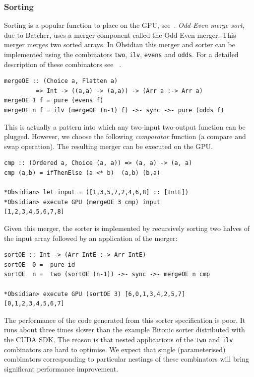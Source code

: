 \subsubsection{Sorting}

Sorting is a popular function to place on the GPU, see~.
{\em Odd-Even merge sort}, due to Batcher, uses a merger component called the Odd-Even merger. This 
merger merges two sorted arrays. In Obsidian this merger and sorter 
can be implemented using the combinators {\tt two}, {\tt ilv}, {\tt evens}
and {\tt odds}. For a detailed description of these combinators see
~.

\begin{small}
\begin{verbatim}
mergeOE :: (Choice a, Flatten a) 
         => Int -> ((a,a) -> (a,a)) -> (Arr a :-> Arr a)
mergeOE 1 f = pure (evens f)
mergeOE n f = ilv (mergeOE (n-1) f) ->- sync ->- pure (odds f)
\end{verbatim}
\end{small}
\noindent
This is actually a pattern into which any two-input two-output function
can be plugged. However, we choose the following {\em comparator} function (a compare and swap operation). The resulting merger can be executed on the GPU.
\begin{small}
\begin{verbatim}
cmp :: (Ordered a, Choice (a, a)) => (a, a) -> (a, a)
cmp (a,b) = ifThenElse (a <* b)  (a,b) (b,a)

*Obsidian> let input = ([1,3,5,7,2,4,6,8] :: [IntE]) 
*Obsidian> execute GPU (mergeOE 3 cmp) input
[1,2,3,4,5,6,7,8]
\end{verbatim}
\end{small}
\noindent
Given this merger, the sorter is implemented by recursively sorting 
two halves of the input array followed by an application of the merger:

\begin{small}
\begin{verbatim}
sortOE :: Int -> (Arr IntE :-> Arr IntE)
sortOE  0 =  pure id
sortOE  n =  two (sortOE (n-1)) ->- sync ->- mergeOE n cmp 

*Obsidian> execute GPU (sortOE 3) [6,0,1,3,4,2,5,7]
[0,1,2,3,4,5,6,7]
\end{verbatim}
\end{small}

The performance of the code generated from this sorter specification is poor. It
runs about three times slower than the example Bitonic
sorter distributed with the CUDA SDK. 
The reason is that nested applications of the {\tt two} and {\tt ilv} 
combinators are hard to optimise. We expect that single (parameterised) combinators corresponding
to particular nestings of these combinators will bring significant performance improvement.
%


